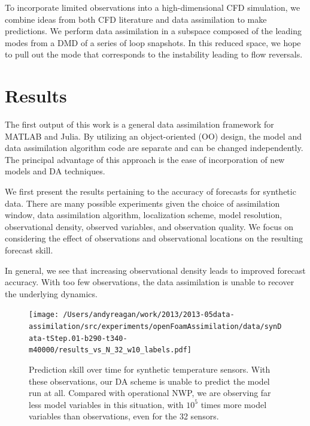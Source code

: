 To incorporate limited observations into a high-dimensional CFD simulation, we combine ideas from both CFD literature and data assimilation to make predictions.
We perform data assimilation in a subspace composed of the leading modes from a DMD of a series of loop snapshots.
In this reduced space, we hope to pull out the mode that corresponds to the instability leading to flow reversals.

\section{Results}

The first output of this work is a general data assimilation framework for MATLAB and Julia.
By utilizing an object-oriented (OO) design, the model and data assimilation algorithm code are separate and can be changed independently.
The principal advantage of this approach is the ease of incorporation of new models and DA techniques.

We first present the results pertaining to the accuracy of forecasts for synthetic data.
There are many possible experiments given the choice of assimilation window, data assimilation algorithm, localization scheme, model resolution, observational density, observed variables, and observation quality.
We focus on considering the effect of observations and observational locations on the resulting forecast skill.

In general, we see that increasing observational density leads to improved forecast accuracy.
With too few observations, the data assimilation is unable to recover the underlying dynamics.

\begin{figure}[h!]
  \centering
  \texttt{[image: /Users/andyreagan/work/2013/2013-05data-assimilation/src/experiments/openFoamAssimilation/data/synData-tStep.01-b290-t340-m40000/results\_vs\_N\_32\_w10\_labels.pdf]}
  \caption[Prediction skill over time for synthetic temperature sensors]{
    Prediction skill over time for synthetic temperature sensors.
    With these observations, our DA scheme is unable to predict the model run at all.
    Compared with operational NWP, we are observing far less model variables in this situation, with $10^5$ times more model variables than observations, even for the 32 sensors.
  }
  \label{fig:TsensorExp}
\end{figure}

